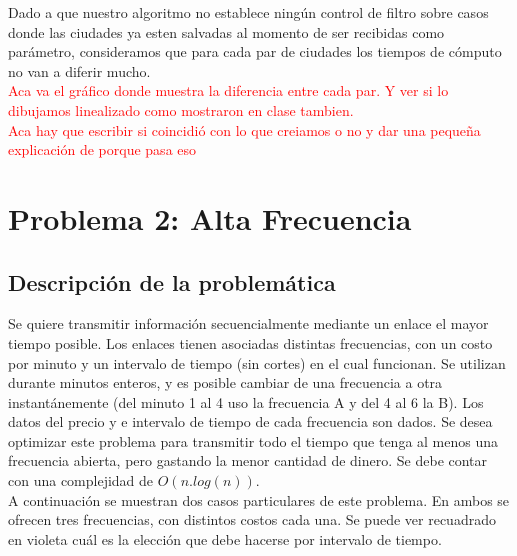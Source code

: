 \documentclass[a4paper]{article}
\begin{document}
Dado a que nuestro algoritmo no establece ning\'un control de filtro sobre casos donde las ciudades ya esten salvadas al momento de ser recibidas como par\'ametro, consideramos que para cada par de ciudades los tiempos de c\'omputo no van a diferir mucho.\\

\textcolor{red}{Aca va el gr\'afico donde muestra la diferencia entre cada par. Y ver si lo dibujamos linealizado como mostraron en clase tambien.}\\

\textcolor{red}{Aca hay que escribir si coincidi\'o con lo que creiamos o no y dar una peque\~na explicaci\'on de porque pasa eso}










\newpage

\section{Problema 2: Alta Frecuencia}
\subsection{Descripci\'on de la problem\'atica}

Se quiere transmitir informaci\'on secuencialmente mediante un enlace el mayor tiempo posible. Los enlaces tienen asociadas distintas frecuencias, con un costo por minuto y un intervalo de tiempo (sin cortes) en el cual funcionan. Se utilizan durante minutos enteros, y es posible cambiar de una frecuencia a otra instant\'anemente (del minuto 1 al 4 uso la frecuencia A y del 4 al 6 la B). Los datos del precio y e intervalo de tiempo de cada frecuencia son dados. Se desea optimizar este problema para transmitir todo el tiempo que tenga al menos una frecuencia abierta, pero gastando la menor cantidad de dinero. Se debe contar con una complejidad de $O(n.log(n))$.\\

A continuaci\'on se muestran dos casos particulares de este problema. En ambos se ofrecen tres frecuencias, con distintos costos cada una. Se puede ver recuadrado en violeta cu\'al es la elecci\'on que debe hacerse por intervalo de tiempo.
\end{document}
